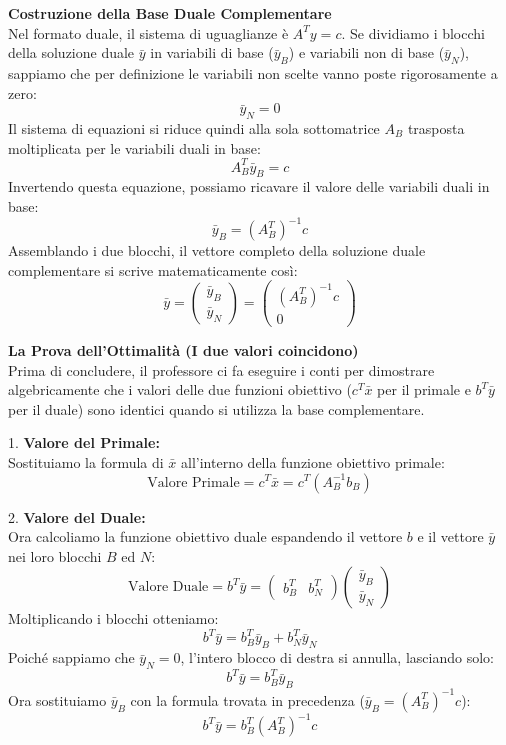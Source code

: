 \documentclass[12pt, a4paper]{article}
\begin{document}
	\vspace{0.4cm}
	\textbf{Costruzione della Base Duale Complementare}\\
	Nel formato duale, il sistema di uguaglianze è $A^T y = c$. 
	Se dividiamo i blocchi della soluzione duale $\bar{y}$ in variabili di base ($\bar{y}_B$) e variabili non di base ($\bar{y}_N$), sappiamo che per definizione le variabili non scelte vanno poste rigorosamente a zero:
	\[
	\bar{y}_N = 0
	\]
	Il sistema di equazioni si riduce quindi alla sola sottomatrice $A_B$ trasposta moltiplicata per le variabili duali in base:
	\[
	A_B^T \bar{y}_B = c
	\]
	Invertendo questa equazione, possiamo ricavare il valore delle variabili duali in base:
	\[
	\bar{y}_B = (A_B^T)^{-1} c
	\]
	Assemblando i due blocchi, il vettore completo della soluzione duale complementare si scrive matematicamente così:
	\[
	\bar{y} = \begin{pmatrix} \bar{y}_B \\ \bar{y}_N \end{pmatrix} = \begin{pmatrix} (A_B^T)^{-1} c \\ 0 \end{pmatrix}
	\]
	
	\vspace{0.4cm}
	\textbf{La Prova dell'Ottimalità (I due valori coincidono)}\\
	Prima di concludere, il professore ci fa eseguire i conti per dimostrare algebricamente che i valori delle due funzioni obiettivo ($c^T \bar{x}$ per il primale e $b^T \bar{y}$ per il duale) sono identici quando si utilizza la base complementare.
	
	1. \textbf{Valore del Primale:}\\
	Sostituiamo la formula di $\bar{x}$ all'interno della funzione obiettivo primale:
	\[
	\text{Valore Primale} = c^T \bar{x} = c^T (A_B^{-1} b_B)
	\]
	
	2. \textbf{Valore del Duale:}\\
	Ora calcoliamo la funzione obiettivo duale espandendo il vettore $b$ e il vettore $\bar{y}$ nei loro blocchi $B$ ed $N$:
	\[
	\text{Valore Duale} = b^T \bar{y} = \begin{pmatrix} b_B^T & b_N^T \end{pmatrix} \begin{pmatrix} \bar{y}_B \\ \bar{y}_N \end{pmatrix}
	\]
	Moltiplicando i blocchi otteniamo:
	\[
	b^T \bar{y} = b_B^T \bar{y}_B + b_N^T \bar{y}_N
	\]
	Poiché sappiamo che $\bar{y}_N = 0$, l'intero blocco di destra si annulla, lasciando solo:
	\[
	b^T \bar{y} = b_B^T \bar{y}_B
	\]
	Ora sostituiamo $\bar{y}_B$ con la formula trovata in precedenza ($\bar{y}_B = (A_B^T)^{-1} c$):
	\[
	b^T \bar{y} = b_B^T (A_B^T)^{-1} c
	\]
	
\end{document}
